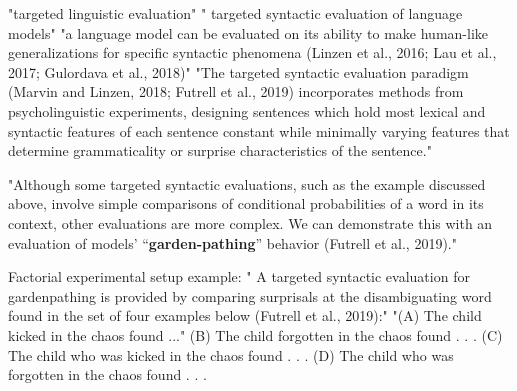 
"targeted linguistic evaluation" \citep{hu2020systematic}
" targeted syntactic evaluation of language models" \citep{marvin2018targeted}
"a language model can be evaluated on its ability to make human-like generalizations for specific syntactic phenomena (Linzen et al., 2016; Lau et al., 2017; Gulordava et al., 2018)"  \citep{hu2020systematic}
"The targeted syntactic evaluation paradigm (Marvin and Linzen, 2018; Futrell et al., 2019) incorporates methods from psycholinguistic experiments,
designing sentences which hold most lexical and syntactic features of each sentence constant while minimally varying features that determine grammaticality or surprise characteristics of the sentence."  \citep{hu2020systematic}


"Although some targeted syntactic evaluations, such as the example discussed above, involve simple comparisons of conditional probabilities of a word in its context, other evaluations are more complex. We can demonstrate this with an evaluation of models’ “\textbf{garden-pathing}” behavior (Futrell et al., 2019)." \citep{hu2020systematic}

Factorial experimental setup example:
" A targeted syntactic evaluation for gardenpathing is provided by comparing surprisals at the disambiguating word found in the set of four examples below (Futrell et al., 2019):"\citep{hu2020systematic}
"(A) The child kicked in the chaos found ..."
(B) The child forgotten in the chaos found . . .
(C) The child who was kicked in the chaos found . . .
(D) The child who was forgotten in the chaos found . . .


